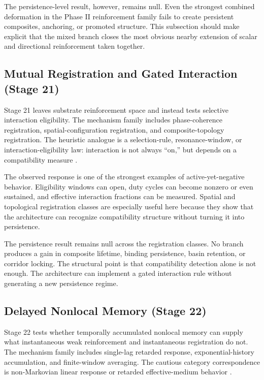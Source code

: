 \documentclass[11pt]{article}
\begin{document}
The persistence-level result, however, remains null. Even the strongest combined deformation in the Phase II reinforcement family fails to create persistent composites, anchoring, or promoted structure. This subsection should make explicit that the mixed branch closes the most obvious nearby extension of scalar and directional reinforcement taken together.

\subsection{Mutual Registration and Gated Interaction (Stage 21)}

Stage 21 leaves substrate reinforcement space and instead tests selective interaction eligibility. The mechanism family includes phase-coherence registration, spatial-configuration registration, and composite-topology registration. The heuristic analogue is a selection-rule, resonance-window, or interaction-eligibility law: interaction is not always ``on,'' but depends on a compatibility measure \cite{selection_rule_placeholder,resonance_placeholder}.

The observed response is one of the strongest examples of active-yet-negative behavior. Eligibility windows can open, duty cycles can become nonzero or even sustained, and effective interaction fractions can be measured. Spatial and topological registration classes are especially useful here because they show that the architecture can recognize compatibility structure without turning it into persistence.

The persistence result remains null across the registration classes. No branch produces a gain in composite lifetime, binding persistence, basin retention, or corridor locking. The structural point is that compatibility detection alone is not enough. The architecture can implement a gated interaction rule without generating a new persistence regime.

\subsection{Delayed Nonlocal Memory (Stage 22)}

Stage 22 tests whether temporally accumulated nonlocal memory can supply what instantaneous weak reinforcement and instantaneous registration do not. The mechanism family includes single-lag retarded response, exponential-history accumulation, and finite-window averaging. The cautious category correspondence is non-Markovian linear response or retarded effective-medium behavior \cite{nonmarkov_placeholder,retarded_response_placeholder}.
\end{document}
